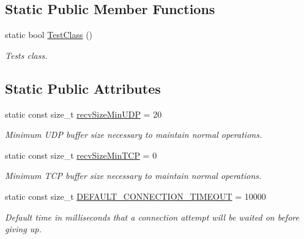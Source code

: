 \subsection*{Static Public Member Functions}
\begin{DoxyCompactItemize}
\item 
static bool \hyperlink{class_net_instance_server_a1fcda8d3abed6eb0861121beac3a5d27}{TestClass} ()
\begin{DoxyCompactList}\small\item\em Tests class. \item\end{DoxyCompactList}\end{DoxyCompactItemize}
\subsection*{Static Public Attributes}
\begin{DoxyCompactItemize}
\item 
\hypertarget{class_net_instance_server_a696823c10d42a6fd99014fd3f60c13db}{
static const size\_\-t \hyperlink{class_net_instance_server_a696823c10d42a6fd99014fd3f60c13db}{recvSizeMinUDP} = 20}
\label{class_net_instance_server_a696823c10d42a6fd99014fd3f60c13db}

\begin{DoxyCompactList}\small\item\em Minimum UDP buffer size necessary to maintain normal operations. \item\end{DoxyCompactList}\item 
\hypertarget{class_net_instance_server_a510912085bc79be443909904ee727b64}{
static const size\_\-t \hyperlink{class_net_instance_server_a510912085bc79be443909904ee727b64}{recvSizeMinTCP} = 0}
\label{class_net_instance_server_a510912085bc79be443909904ee727b64}

\begin{DoxyCompactList}\small\item\em Minimum TCP buffer size necessary to maintain normal operations. \item\end{DoxyCompactList}\item 
\hypertarget{class_net_instance_server_ace7e83c6a82f0810cee2c7c638bb9397}{
static const size\_\-t \hyperlink{class_net_instance_server_ace7e83c6a82f0810cee2c7c638bb9397}{DEFAULT\_\-CONNECTION\_\-TIMEOUT} = 10000}
\label{class_net_instance_server_ace7e83c6a82f0810cee2c7c638bb9397}

\begin{DoxyCompactList}\small\item\em Default time in milliseconds that a connection attempt will be waited on before giving up. \item\end{DoxyCompactList}\end{DoxyCompactItemize}
